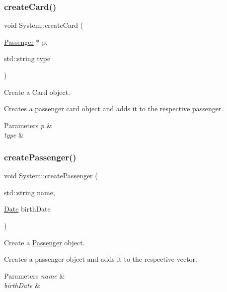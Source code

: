 \subsubsection{\texorpdfstring{create\+Card()}{createCard()}}
{\footnotesize\ttfamily void System\+::create\+Card (\begin{DoxyParamCaption}\item[{\mbox{\hyperlink{classPassenger}{Passenger}} $\ast$}]{p,  }\item[{std\+::string}]{type }\end{DoxyParamCaption})}



Create a Card object. 

Creates a passenger card object and adds it to the respective passenger.


\begin{DoxyParams}{Parameters}
{\em p} & \\
\hline
{\em type} & \\
\hline
\end{DoxyParams}
\mbox{\label{classSystem_a623d7369872a9af9b69b24bd2a3c71b1}} 
\subsubsection{\texorpdfstring{create\+Passenger()}{createPassenger()}}
{\footnotesize\ttfamily void System\+::create\+Passenger (\begin{DoxyParamCaption}\item[{std\+::string}]{name,  }\item[{\mbox{\hyperlink{classDate}{Date}}}]{birth\+Date }\end{DoxyParamCaption})}



Create a \mbox{\hyperlink{classPassenger}{Passenger}} object. 

Creates a passenger object and adds it to the respective vector.


\begin{DoxyParams}{Parameters}
{\em name} & \\
\hline
{\em birth\+Date} & \\
\hline
\end{DoxyParams}
\mbox{\label{classSystem_ab8cf1529f497af79b72fe6cc59b08d60}} 
